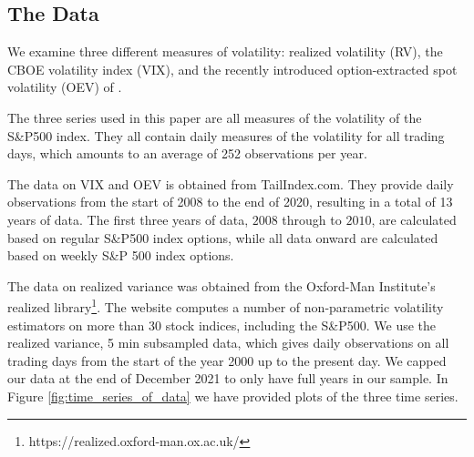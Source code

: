 \documentclass[fleqn,11pt,letterpaper]{article}
\theoremstyle{plain}
\theoremstyle{definition}
\theoremstyle{remark}
\numberwithin{equation}{section}
\begin{document}
\subsection{The Data}\label{section:data}

We examine three different measures of volatility: realized volatility (RV), the CBOE volatility index (VIX), and the recently introduced option-extracted spot volatility (OEV) of \cite{Todorov2019}.


The three series used in this paper are all measures of the volatility of the S\&P500 index. They all contain daily measures of the volatility for all trading days, which amounts to an average of 252 observations per year. 

The data on VIX and OEV is obtained from TailIndex.com. They provide daily observations from the start of 2008 to the end of 2020, resulting in a total of 13 years of data. The first three years of data, $2008$ through to $2010$, are calculated based on regular S\&P500 index options, while all data onward are calculated based on weekly S\&P 500 index options. 

The data on realized variance was obtained from the Oxford-Man Institute's realized library\footnote{https://realized.oxford-man.ox.ac.uk/}. The website computes a number of non-parametric volatility estimators on more than 30 stock indices, including the S\&P500. We use the realized variance, 5 min subsampled data, which gives daily observations on all trading days from the start of the year 2000 up to the present day. We capped our data at the end of December 2021 to only have full years in our sample. In Figure \ref{fig:time_series_of_data} we have provided plots of the three time series. %
\end{document}
